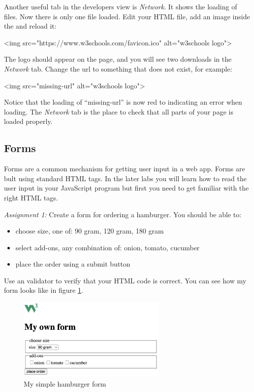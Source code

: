 \documentclass[fleqn, article, a4paper]{memoir}
\begin{document}
Another useful tab in the developers view is \emph{Network}. It shows the loading of files. Now there is only one file loaded. Edit your HTML file, add an image inside the  and reload it:
\begin{Code}
<img src="https://www.w3schools.com/favicon.ico" alt="w3schools logo">
\end{Code}
The logo should appear on the page, and you will see two downloads in the \emph{Network} tab. Change the url to something that does not exist, for example:
\begin{Code}
<img src="missing-url" alt="w3schools logo">
\end{Code}
Notice that the loading of ``missing-url'' is now red to indicating an error when loading. The \emph{Network} tab is the place to check that all parts of your page is loaded properly.

\subsection*{Forms}
Forms are a common mechanism for getting user input in a web app. Forms are bult using standard HTML tags. In the later labs you will learn how to read the user input in your JavaScript program but first you need to get familiar with the right HTML tags.

\medskip
\noindent \emph{Assignment 1:} Create a form for ordering a hamburger. You should be able to:
\begin{itemize}
\item choose size, one of: 90 gram, 120 gram, 180 gram
\item select add-ons, any combination of: onion, tomato, cucumber
\item place the order using a submit button
\end{itemize}
Use an validator to verify that your HTML code is correct. You can see how my form looks like in figure \ref{fig:form}.

\begin{figure}[h]
\caption{My simple hamburger form}
\label{fig:form}
\centering
\includegraphics[height=4cm]{include/form.png}
\end{figure}
\end{document}
